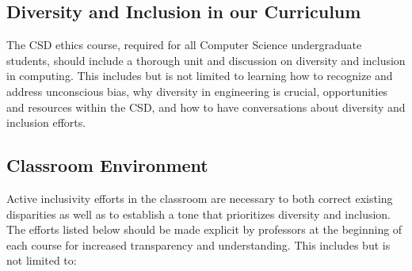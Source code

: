 \documentclass{article}
\begin{document}
\subsection{Diversity and Inclusion in our Curriculum} 
The CSD ethics course, required for all Computer Science undergraduate students, 
should include a thorough unit and discussion on diversity and inclusion in computing. 
This includes but is not limited to learning how to recognize and address unconscious bias, why diversity in 
engineering is crucial, opportunities and resources within the CSD, and how to have conversations about diversity 
and inclusion efforts.

\subsection{Classroom Environment} 
Active inclusivity efforts in the classroom are necessary to both correct existing disparities as well as to 
establish a tone that prioritizes diversity and inclusion. The efforts listed below should be made explicit by 
professors at the beginning of each course for increased transparency and understanding. 
This includes but is not limited to: 
\end{document}
